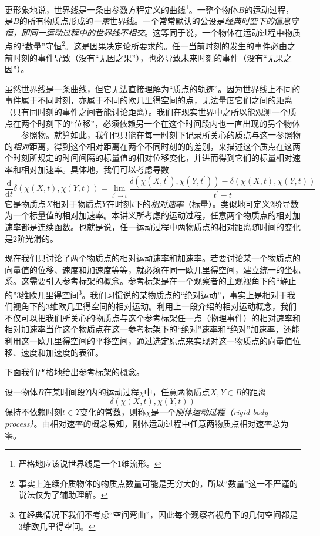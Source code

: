 \documentclass[main.tex]{subfiles}
\begin{document}
更形象地说，世界线是一条由参数方程定义的曲线\footnote{严格地应该说世界线是一个1维流形。}。一整个物体$B$的运动过程，是$B$的所有物质点形成的\emph{一束}世界线。一个常常默认的公设是\emph{经典时空下的信息守恒，即同一运动过程中的世界线不相交}。这等同于说，一个物体在运动过程中物质点的“数量”守恒\footnote{事实上连续介质物体的物质点数量可能是无穷大的，所以“数量”这一不严谨的说法仅为了辅助理解。}。这是因果决定论所要求的。任一当前时刻的发生的事件必由之前时刻的事件导致（没有“无因之果”），也必导致未来时刻的事件（没有“无果之因”）。

虽然世界线是一条曲线，但它无法直接理解为“质点的轨迹”。因为世界线上不同的事件属于不同时刻，亦属于不同的欧几里得空间的点，无法量度它们之间的距离（只有同时刻的事件之间者能讨论距离）。我们在现实世界中之所以能观测一个质点在两个时刻下的“位移”，必须依赖另一个在这个时间段内也一直出现的另个物体——参照物。就算如此，我们也只能在每一时刻下记录所关心的质点与这一参照物的\emph{相对}距离，得到这个相对距离在两个不同时刻的的差别，来描述这个质点在这两个时刻所规定的时间间隔的标量值的相对位移变化，并进而得到它们的标量相对速率和相对加速率。具体地，我们可以考虑导数
\[\frac{\mathrm{d}}{\mathrm{d}t}\delta\left(\chi\left(X,t\right),\chi\left(Y,t\right)\right)=\lim_{t^\prime\to t}\frac{\delta\left(\chi\left(X,t^\prime\right),\chi\left(Y,t^\prime\right)\right)-\delta\left(\chi\left(X,t\right),\chi\left(Y,t\right)\right)}{t^\prime-t}\]
它是物质点$X$相对于物质点$Y$在时刻$t$下的\emph{相对速率}（标量）。类似地可定义2阶导数为一个标量值的相对加速率。本讲义所考虑的运动过程，任意两个物质点的相对加速率都是连续函数。也就是说，任一运动过程中两物质点的相对距离随时间的变化是2阶光滑的。

现在我们只讨论了两个物质点的相对运动速率和加速率。若要讨论某一个物质点的向量值的位移、速度和加速度等等，就必须在同一欧几里得空间，建立统一的坐标系。这需要引入参考标架的概念。参考标架是在一个观察者的主观视角下的“静止的”3维欧几里得空间\footnote{在经典情况下我们不考虑“空间弯曲”，因此每个观察者视角下的几何空间都是3维欧几里得空间。}。我们习惯说的某物质点的“绝对运动”，事实上是相对于我们视角下的3维欧几里得空间的相对运动。利用上一段介绍的相对运动概念，我们不仅可以把我们所关心的物质点与这个参考标架任一点（物理事件）的相对速率和相对加速率当作这个物质点在这一参考标架下的“绝对”速率和“绝对”加速率，还能利用这一欧几里得空间的平移空间，通过选定原点来实现对这一物质点的向量值位移、速度和加速度的表征。

下面我们严格地给出参考标架的概念。

设一物体$B$在某时间段$\Upsilon$内的运动过程$\chi$中，任意两物质点$X,Y\in B$的距离
\[\delta\left(\chi\left(X,t\right),\chi\left(Y,t\right)\right)\]
保持不依赖时刻$t\in\Upsilon$变化的常数，则称$\chi$是一个\emph{刚体运动过程（rigid body process）}。由相对速率的概念易知，刚体运动过程中任意两物质点相对速率总为零。
\end{document}
